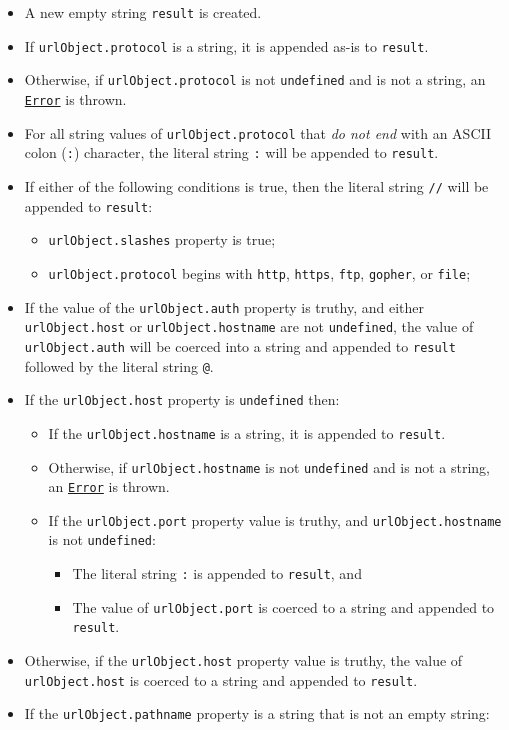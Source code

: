 \begin{itemize}
\tightlist
\item
  A new empty string \texttt{result} is created.
\item
  If \texttt{urlObject.protocol} is a string, it is appended as-is to
  \texttt{result}.
\item
  Otherwise, if \texttt{urlObject.protocol} is not \texttt{undefined}
  and is not a string, an \href{errors.md\#class-error}{\texttt{Error}}
  is thrown.
\item
  For all string values of \texttt{urlObject.protocol} that \emph{do not
  end} with an ASCII colon (\texttt{:}) character, the literal string
  \texttt{:} will be appended to \texttt{result}.
\item
  If either of the following conditions is true, then the literal string
  \texttt{//} will be appended to \texttt{result}:

  \begin{itemize}
  \tightlist
  \item
    \texttt{urlObject.slashes} property is true;
  \item
    \texttt{urlObject.protocol} begins with \texttt{http},
    \texttt{https}, \texttt{ftp}, \texttt{gopher}, or \texttt{file};
  \end{itemize}
\item
  If the value of the \texttt{urlObject.auth} property is truthy, and
  either \texttt{urlObject.host} or \texttt{urlObject.hostname} are not
  \texttt{undefined}, the value of \texttt{urlObject.auth} will be
  coerced into a string and appended to \texttt{result} followed by the
  literal string \texttt{@}.
\item
  If the \texttt{urlObject.host} property is \texttt{undefined} then:

  \begin{itemize}
  \tightlist
  \item
    If the \texttt{urlObject.hostname} is a string, it is appended to
    \texttt{result}.
  \item
    Otherwise, if \texttt{urlObject.hostname} is not \texttt{undefined}
    and is not a string, an
    \href{errors.md\#class-error}{\texttt{Error}} is thrown.
  \item
    If the \texttt{urlObject.port} property value is truthy, and
    \texttt{urlObject.hostname} is not \texttt{undefined}:

    \begin{itemize}
    \tightlist
    \item
      The literal string \texttt{:} is appended to \texttt{result}, and
    \item
      The value of \texttt{urlObject.port} is coerced to a string and
      appended to \texttt{result}.
    \end{itemize}
  \end{itemize}
\item
  Otherwise, if the \texttt{urlObject.host} property value is truthy,
  the value of \texttt{urlObject.host} is coerced to a string and
  appended to \texttt{result}.
\item
  If the \texttt{urlObject.pathname} property is a string that is not an
  empty string:


\end{itemize}

